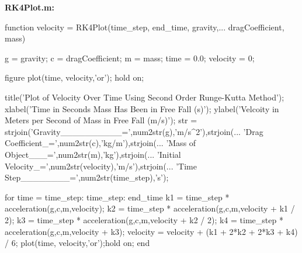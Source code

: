 \documentclass[12pt]{article}
\begin{document}
\textbf{RK4Plot.m:}
\begin{verbatimtab}
function velocity = RK4Plot(time_step, end_time, gravity,... 
                        dragCoefficient, mass)
                    

    g = gravity;            %
    c = dragCoefficient;    %
    m = mass;               %
    time = 0.0;             %
    velocity = 0;           %

    figure
    plot(time, velocity,'or'); hold on;
    
    title('Plot of Velocity Over Time Using Second Order Runge-Kutta Method');
    xlabel('Time in Seconds Mass Has Been in Free Fall (s)');%
    ylabel('Velcoity in Meters per Second of Mass in Free Fall (m/s)');
    str = {strjoin({'Gravity__________=',num2str(g),'m/s^2'}),strjoin(...      %
                   {'Drag Coefficient_=',num2str(c),'kg/m'}),strjoin(...       %
                   {'Mass of Object___=',num2str(m),'kg'}),strjoin(...         %
                   {'Initial Velocity_=',num2str(velocity),'m/s'}),strjoin(... %
                   {'Time Step________=',num2str(time_step),'s'})};            %
    
    for time = time_step: time_step: end_time
        k1 = time_step * acceleration(g,c,m,velocity);
        k2 = time_step * acceleration(g,c,m,velocity + k1 / 2);
        k3 = time_step * acceleration(g,c,m,velocity + k2 / 2);
        k4 = time_step * acceleration(g,c,m,velocity + k3);
        velocity = velocity + (k1 + 2*k2 + 2*k3 + k4) / 6;
        plot(time, velocity,'or');hold on;
    end
    

\end{verbatimtab}
\end{document}

